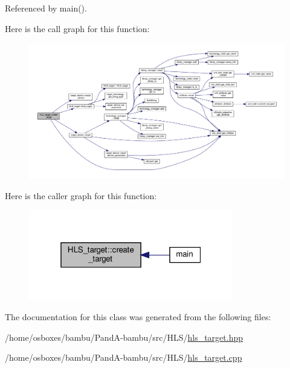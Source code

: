 Referenced by main().

Here is the call graph for this function\+:
\nopagebreak
\begin{figure}[H]
\begin{center}
\leavevmode
\includegraphics[width=350pt]{dd/dff/classHLS__target_a08b0c129bed7fe1817fb47e52aeb5b86_cgraph}
\end{center}
\end{figure}
Here is the caller graph for this function\+:
\nopagebreak
\begin{figure}[H]
\begin{center}
\leavevmode
\includegraphics[width=253pt]{dd/dff/classHLS__target_a08b0c129bed7fe1817fb47e52aeb5b86_icgraph}
\end{center}
\end{figure}


The documentation for this class was generated from the following files\+:\begin{DoxyCompactItemize}
\item 
/home/osboxes/bambu/\+Pand\+A-\/bambu/src/\+H\+L\+S/\hyperlink{hls__target_8hpp}{hls\+\_\+target.\+hpp}\item 
/home/osboxes/bambu/\+Pand\+A-\/bambu/src/\+H\+L\+S/\hyperlink{hls__target_8cpp}{hls\+\_\+target.\+cpp}\end{DoxyCompactItemize}
